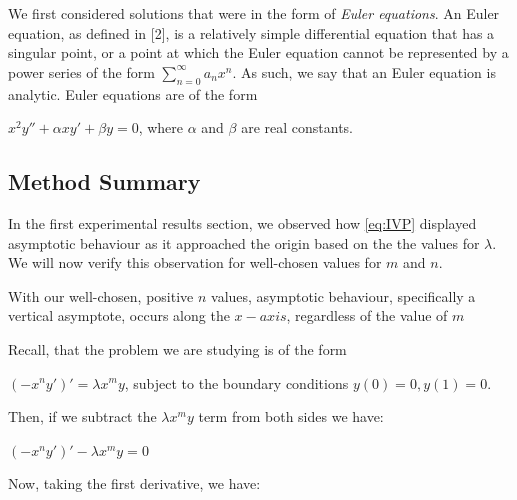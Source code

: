 \documentclass[executivepaper]{article}
\begin{document}
We first considered solutions that were in the form of \textit{Euler equations}. An Euler equation, as defined in [2], is a relatively simple differential equation that has a singular point, or a point at which the Euler equation cannot be represented by a power series of the form $\sum_{n=0}^{\infty} a_{n} x^n$. As such, we say that an Euler equation is analytic. Euler equations are of the form

\begin{center}

$x^2y''+\alpha xy'+\beta y=0$, where $\alpha$ and $\beta$ are real constants.

\end{center}

\subsection*{Method Summary}

In the first experimental results section, we observed how \eqref{eq:IVP} displayed asymptotic behaviour as it approached the origin based on the the values for $\lambda$. We will now verify this observation for well-chosen values for $m$ and $n$.

\begin{observation}

With our well-chosen, positive $n$ values, asymptotic behaviour, specifically a vertical asymptote, occurs along the $x-axis$, regardless of the value of $m$
 
\end{observation}

\vspace{3mm}

Recall, that the problem we are studying is of the form

\begin{center}

$(-x^ny')'=\lambda x^my$, subject to the boundary conditions $y(0)=0, y(1)=0$.

\end{center}

Then, if we subtract the $\lambda x^my$ term from both sides we have:

\begin{center}

$(-x^ny')'-\lambda x^my=0$

\end{center}

Now, taking the first derivative, we have:
\end{document}
